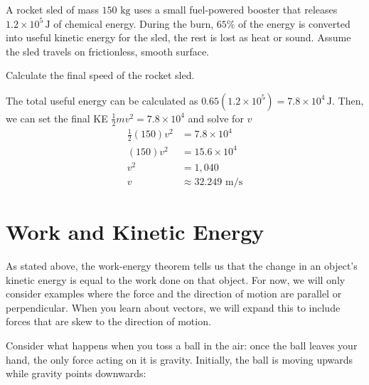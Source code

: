 \begin{Exercise}[title=Blast Off!, label=rocketsled]
  A rocket sled of mass $150 \text{ kg}$ uses a small fuel-powered booster that releases $1.2\times 10^5\,\text{J}$ of chemical energy. During the burn, $65\%$ of the energy is converted into useful kinetic energy for the sled, the rest is lost as heat or sound. Assume the sled travels on frictionless, smooth surface.

  Calculate the final speed of the rocket sled.
\end{Exercise}
\begin{Answer}[ref=rocketsled]
The total useful energy can be calculated as $0.65(1.2\times 10^5) = 7.8\times 10^4\,\text{J}$. Then, we can set the final KE $\frac{1}{2}mv^2 = 7.8\times 10^4$ and solve for $v$
\begin{align*}
  \frac{1}{2}(150)v^2 &= 7.8\times 10^4\\
  (150)v^2 &= 15.6 \times 10^4 \\ 
  v^2 &=1,040 \\ 
  v&\approx32.249 \text{ m/s}
\end{align*}
\end{Answer}

\section{Work and Kinetic Energy}
As stated above, the work-energy theorem tells us that the change in an object's 
kinetic energy is equal to the work done on that object. For now, we will only 
consider examples where the force and the direction of motion are parallel or 
perpendicular. When you learn about vectors, we will expand this to include 
forces that are skew to the direction of motion. 

Consider what happens when you toss a ball in the air: once the ball leaves your 
hand, the only force acting on it is gravity. Initially, the ball is moving 
upwards while gravity points downwards:

\begin{center}
\end{center}


